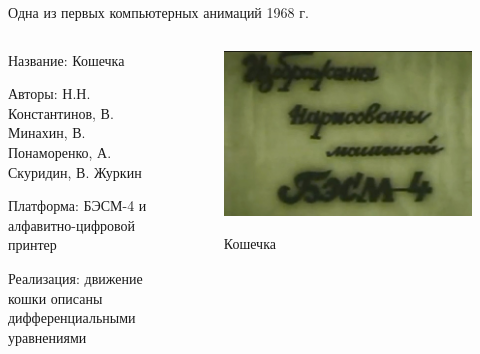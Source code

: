 \documentclass{beamer}
\begin{document}
\begin{frame}{Одна из первых компьютерных анимаций}
	{1968 г.}
	
	\begin{columns}
		\begin{column}{0.5\textwidth}
			
			Название: Кошечка
			
			Авторы: Н.Н. Константинов, В. Минахин, В. Понаморенко, А. Скуридин, В. Журкин
			
			Платформа: БЭСМ-4 и алфавитно-цифровой принтер
			
			Реализация: движение кошки описаны дифференциальными уравнениями
			
		\end{column}
		\begin{column}{0.5\textwidth}
			\begin{figure}
				\href{https://www.youtube.com/watch?v=LzMk5sC6eAU}{
				\includegraphics[width=\textwidth]{images/AnimatedCat.jpg}
				}
				\caption {Кошечка}
			\end{figure}
		\end{column}
	\end{columns}
\end{frame}
\end{document}
